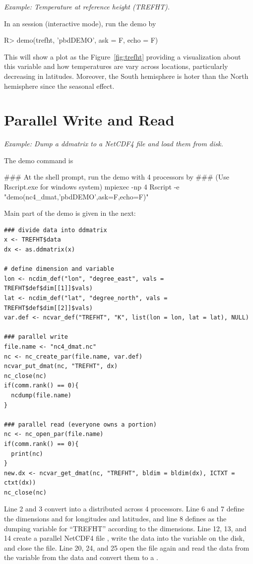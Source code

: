 \emph{Example: Temperature at reference height (TREFHT).}

In an  session (interactive mode), run the demo by
\begin{Code}[title=R Code]
R> demo(trefht, 'pbdDEMO', ask = F, echo = F)
\end{Code}
This will show a plot as the Figure~\ref{fig:trefht} providing a
visualization about this variable and how temperatures are vary
across locations, particularly decreasing in latitudes. Moreover, the
South hemisphere is hoter than the North hemisphere since the seasonal
effect.



\section{Parallel Write and Read}

\emph{Example: Dump a ddmatrix to a NetCDF4 file and load them from disk.}

The demo command is
\begin{Command}
### At the shell prompt, run the demo with 4 processors by
### (Use Rscript.exe for windows system)
mpiexec -np 4 Rscript -e "demo(nc4_dmat,'pbdDEMO',ask=F,echo=F)"
\end{Command}

Main part of the demo is given in the next:
\begin{lstlisting}[language=rr,title=nc4\_dmat]
### divide data into ddmatrix
x <- TREFHT$data
dx <- as.ddmatrix(x)

# define dimension and variable
lon <- ncdim_def("lon", "degree_east", vals = TREFHT$def$dim[[1]]$vals)
lat <- ncdim_def("lat", "degree_north", vals = TREFHT$def$dim[[2]]$vals)
var.def <- ncvar_def("TREFHT", "K", list(lon = lon, lat = lat), NULL)

### parallel write
file.name <- "nc4_dmat.nc"
nc <- nc_create_par(file.name, var.def)
ncvar_put_dmat(nc, "TREFHT", dx)
nc_close(nc)
if(comm.rank() == 0){
  ncdump(file.name)
}

### parallel read (everyone owns a portion)
nc <- nc_open_par(file.name)
if(comm.rank() == 0){
  print(nc)
}
new.dx <- ncvar_get_dmat(nc, "TREFHT", bldim = bldim(dx), ICTXT = ctxt(dx))
nc_close(nc)
\end{lstlisting}

Line 2 and 3 convert  into a  distributed
across 4 processors. Line 6 and 7 define the dimensions
 and  for longitudes and latitudes, and line 8
defines  as the dumping variable for ``TREFHT'' according
to the dimensions.
 Line 12, 13, and 14 create a parallel NetCDF4 file
,
write the data into the variable on the disk, and close the file.
Line 20, 24, and 25 open the file again and read the data from the
variable from the data and convert them to a
.

